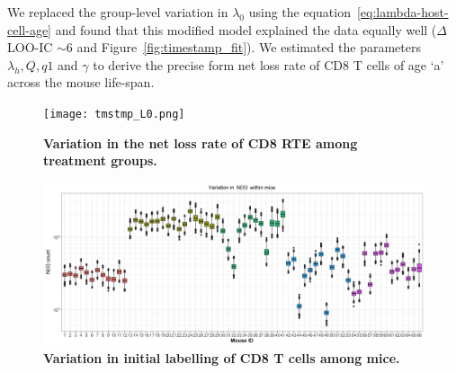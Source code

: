 \documentclass[12pt]{article} %
\begin{document}
We replaced the group-level variation in $\lambda_0$ using the equation~\ref{eq:lambda-host-cell-age} and found that this modified model explained the data equally well ($\Delta$ LOO-IC $\sim 6$ and Figure~\ref{fig:timestamp_fit}).
We estimated the parameters $\lambda_h, Q, q1$ and $\gamma$ to derive the precise form net loss rate of CD8 T cells of age `a' across the mouse life-span.
 
\begin{figure}[htbp]
\centering
      \texttt{[image: tmstmp\_L0.png]}
      \caption{\textbf{Variation in the net loss rate of CD8 RTE among treatment groups.}}
   \label{fig:timestamp_L0}
 \end{figure}

	

\begin{figure}[htbp]
\centering
      \includegraphics[width=\textwidth]{tmstmp_N0.jpeg}
      \caption{\textbf{Variation in initial labelling of CD8 T cells among mice.}}
   \label{fig:timestamp_N0}
 \end{figure}
\end{document}
